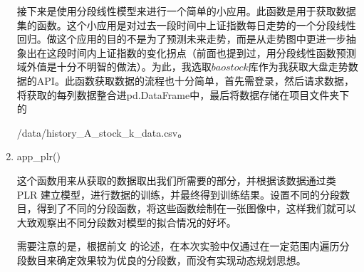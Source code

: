 \begin{enumerate}[(1)]
    接下来是使用分段线性模型来进行一个简单的小应用。此函数是用于获取数据集的函数。这个小应用是对过去一段时间中上证指数每日走势的一个分段线性回归。做这个应用的目的不是为了预测未来走势，而是从走势图中更进一步抽象出在这段时间内上证指数的变化拐点（前面也提到过，用分段线性函数预测域外值是十分不明智的做法）。为此，我选取$baostock$库作为我获取大盘走势数据的API。此函数获取数据的流程也十分简单，首先需登录，然后请求数据，将获取的每列数据整合进pd.DataFrame中，最后将数据存储在项目文件夹下的
    
    /data/history\_A\_stock\_k\_data.csv。
    \item app\_plr()
    
    这个函数用来从获取的数据取出我们所需要的部分，并根据该数据通过类 PLR 建立模型，进行数据的训练，并最终得到训练结果。设置不同的分段数目，得到了不同的分段函数，将这些函数绘制在一张图像中，这样我们就可以大致观察出不同分段数对模型的拟合情况的好坏。

    需要注意的是，根据前文  的论述，在本次实验中仅通过在一定范围内遍历分段数目来确定效果较为优良的分段数，而没有实现动态规划思想。
\end{enumerate}


